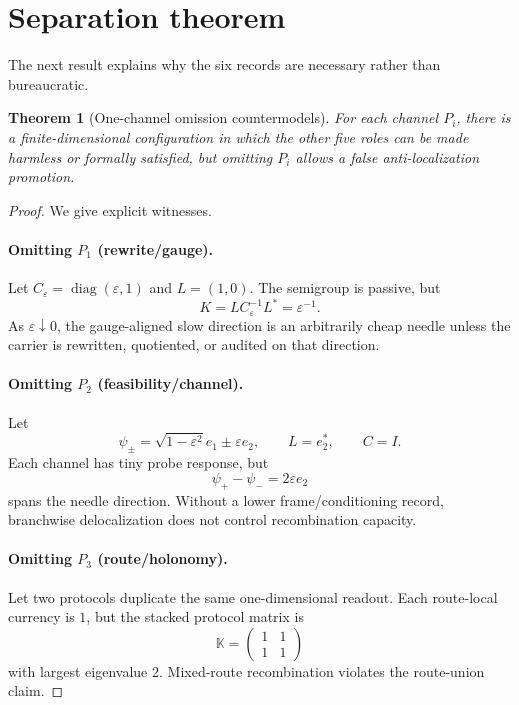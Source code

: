 \documentclass[11pt]{article}
\newtheorem{theorem}{Theorem}
\begin{document}
\section{Separation theorem}
The next result explains why the six records are necessary rather than bureaucratic.

\begin{theorem}[One-channel omission countermodels]
For each channel $P_i$, there is a finite-dimensional configuration in which the other five roles can be made harmless or formally satisfied, but omitting $P_i$ allows a false anti-localization promotion.
\end{theorem}

\begin{proof}
We give explicit witnesses.

\paragraph{Omitting $P_1$ (rewrite/gauge).}
Let $C_\varepsilon=\operatorname{diag}(\varepsilon,1)$ and $L=(1,0)$.  The semigroup is passive, but
\[
  K=L C_\varepsilon^{-1}L^*=\varepsilon^{-1}.
\]
As $\varepsilon\downarrow0$, the gauge-aligned slow direction is an arbitrarily cheap needle unless the carrier is rewritten, quotiented, or audited on that direction.

\paragraph{Omitting $P_2$ (feasibility/channel).}
Let
\[
  \psi_\pm=\sqrt{1-\varepsilon^2}e_1\pm\varepsilon e_2,
  \qquad L=e_2^* ,\qquad C=I.
\]
Each channel has tiny probe response, but
\[
  \psi_+-\psi_-=2\varepsilon e_2
\]
spans the needle direction.  Without a lower frame/conditioning record, branchwise delocalization does not control recombination capacity.

\paragraph{Omitting $P_3$ (route/holonomy).}
Let two protocols duplicate the same one-dimensional readout.  Each route-local currency is $1$, but the stacked protocol matrix is
\[
  \mathbb K=\begin{pmatrix}1&1\\1&1\end{pmatrix}
\]
with largest eigenvalue $2$.  Mixed-route recombination violates the route-union claim.


\end{proof}
\end{document}
